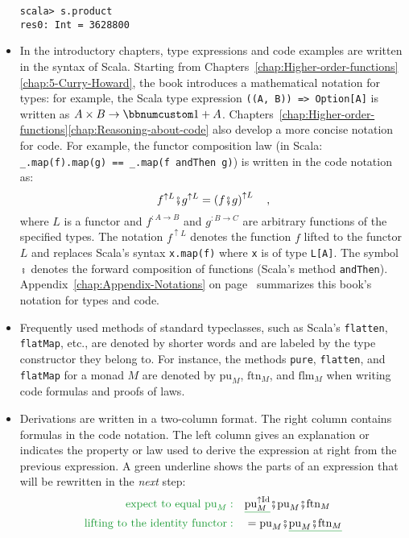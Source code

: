 \begin{itemize}
\begin{lstlisting}[mathescape=true]
scala> s.product
res0: Int = 3628800 
\end{lstlisting}
\item In the introductory chapters, type expressions and code examples are
written in the syntax of Scala. Starting from Chapters~\ref{chap:Higher-order-functions}\textendash \ref{chap:5-Curry-Howard},
the book introduces a mathematical notation for types: for example,
the Scala type expression \lstinline!((A, B)) => Option[A]! is written
as $A\times B\rightarrow\bbnum 1+A$. Chapters~\ref{chap:Higher-order-functions}\textendash \ref{chap:Reasoning-about-code}
also develop a more concise notation for code. For example, the functor
composition law (in Scala: \lstinline!_.map(f).map(g) == _.map(f andThen g)!)
is written in the code notation as:
\[
f^{\uparrow L}\bef g^{\uparrow L}=\left(f\bef g\right)^{\uparrow L}\quad,
\]
where $L$ is a functor and $f^{:A\rightarrow B}$ and $g^{:B\rightarrow C}$
are arbitrary functions of the specified types. The notation $f^{\uparrow L}$
denotes the function $f$ lifted to the functor $L$ and replaces
Scala\textsf{'}s syntax \lstinline!x.map(f)! where \lstinline!x! is of type
\lstinline!L[A]!. The symbol $\bef$ denotes the forward composition
of functions (Scala\textsf{'}s method \lstinline!andThen!). Appendix~\ref{chap:Appendix-Notations}
on page~\pageref{chap:Appendix-Notations} summarizes this book\textsf{'}s
notation for types and code.
\item Frequently used methods of standard typeclasses, such as Scala\textsf{'}s \lstinline!flatten!,
\lstinline!flatMap!, etc., are denoted by shorter words and are labeled
by the type constructor they belong to. For instance, the methods
\lstinline!pure!, \lstinline!flatten!, and \lstinline!flatMap!
for a monad $M$ are denoted by $\text{pu}_{M}$, $\text{ftn}_{M}$,
and $\text{flm}_{M}$ when writing code formulas and proofs of laws.
\item Derivations are written in a two-column format. The right column contains
formulas in the code notation. The left column gives an explanation
or indicates the property or law used to derive the expression at
right from the previous expression. A green underline shows the parts
of an expression that will be rewritten in the \emph{next} step:
\begin{align*}
{\color{greenunder}\text{expect to equal }\text{pu}_{M}:}\quad & \gunderline{\text{pu}_{M}^{\uparrow\text{Id}}}\bef\text{pu}_{M}\bef\text{ftn}_{M}\\
{\color{greenunder}\text{lifting to the identity functor}:}\quad & =\text{pu}_{M}\bef\gunderline{\text{pu}_{M}\bef\text{ftn}_{M}}\\

\end{align*}
\end{itemize}
